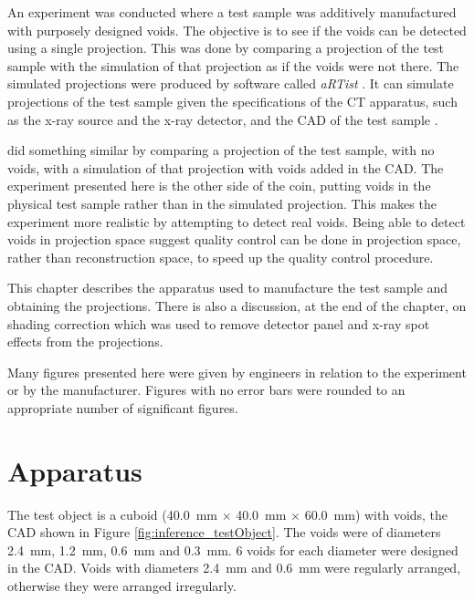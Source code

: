 An experiment was conducted where a test sample was additively manufactured with purposely designed voids. The objective is to see if the voids can be detected using a single projection. This was done by comparing a projection of the test sample with the simulation of that projection as if the voids were not there. The simulated projections were produced by software called \emph{aRTist} \citep{bellon2007artist, jaenisch2008artist, bellon2012radiographic}. It can simulate projections of the test sample given the specifications of the CT apparatus, such as the x-ray source and the x-ray detector, and the CAD of the test sample \citep{bellon2011simulation, deresch2012simulating}.

\cite{brierley2018optimized} did something similar by comparing a projection of the test sample, with no voids, with a simulation of that projection with voids added in the CAD. The experiment presented here is the other side of the coin, putting voids in the physical test sample rather than in the simulated projection. This makes the experiment more realistic by attempting to detect real voids. Being able to detect voids in projection space suggest quality control can be done in projection space, rather than reconstruction space, to speed up the quality control procedure.

This chapter describes the apparatus used to manufacture the test sample and obtaining the projections. There is also a discussion, at the end of the chapter, on shading correction which was used to remove detector panel and x-ray spot effects from the projections.

Many figures presented here were given by engineers in relation to the experiment or by the manufacturer. Figures with no error bars were rounded to an appropriate number of significant figures.

\section{Apparatus}

The test object is a cuboid (\SI{40.0}{\milli\metre} $\times$ \SI{40.0}{\milli\metre} $\times$ \SI{60.0}{\milli\metre}) with voids, the CAD shown in Figure \ref{fig:inference_testObject}. The voids were of diameters \SI{2.4}{\milli\metre}, \SI{1.2}{\milli\metre}, \SI{0.6}{\milli\metre} and \SI{0.3}{\milli\metre}. 6 voids for each diameter were designed in the CAD. Voids with diameters \SI{2.4}{\milli\metre} and \SI{0.6}{\milli\metre} were regularly arranged, otherwise they were arranged irregularly.

